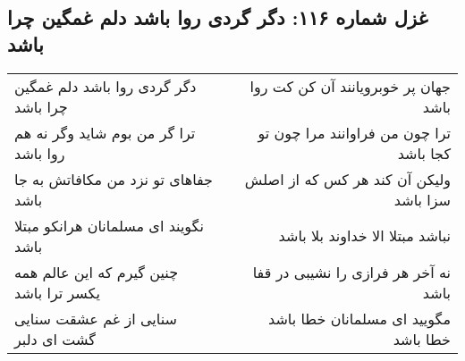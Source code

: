 \begin{center}
\section*{غزل شماره ۱۱۶: دگر گردی روا باشد دلم غمگین چرا باشد}
\label{sec:116}
\begin{longtable}{l p{0.5cm} r}
دگر گردی روا باشد دلم غمگین چرا باشد
&&
جهان پر خوبرویانند آن کن کت روا باشد
\\
ترا گر من بوم شاید وگر نه هم روا باشد
&&
ترا چون من فراوانند مرا چون تو کجا باشد
\\
جفاهای تو نزد من مکافاتش به جا باشد
&&
ولیکن آن کند هر کس که از اصلش سزا باشد
\\
نگویند ای مسلمانان هرانکو مبتلا باشد
&&
نباشد مبتلا الا خداوند بلا باشد
\\
چنین گیرم که این عالم همه یکسر ترا باشد
&&
نه آخر هر فرازی را نشیبی در قفا باشد
\\
سنایی از غم عشقت سنایی گشت ای دلبر
&&
مگویید ای مسلمانان خطا باشد خطا باشد
\\
\end{longtable}
\end{center}
